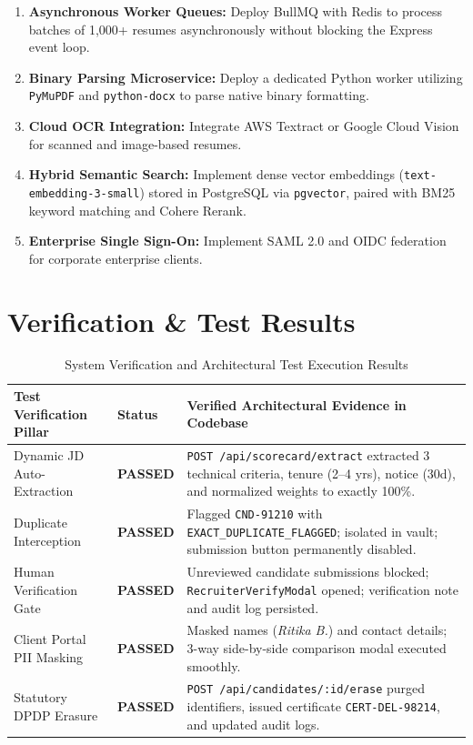 \documentclass[11pt,a4paper,oneside]{report}
\begin{document}
\begin{enumerate}[leftmargin=1.5em]
    \item \textbf{Asynchronous Worker Queues:} Deploy BullMQ with Redis to process batches of 1,000+ resumes asynchronously without blocking the Express event loop.
    \item \textbf{Binary Parsing Microservice:} Deploy a dedicated Python worker utilizing \texttt{PyMuPDF} and \texttt{python-docx} to parse native binary formatting.
    \item \textbf{Cloud OCR Integration:} Integrate AWS Textract or Google Cloud Vision for scanned and image-based resumes.
    \item \textbf{Hybrid Semantic Search:} Implement dense vector embeddings (\texttt{text-embedding-3-small}) stored in PostgreSQL via \texttt{pgvector}, paired with BM25 keyword matching and Cohere Rerank.
    \item \textbf{Enterprise Single Sign-On:} Implement SAML 2.0 and OIDC federation for corporate enterprise clients.
\end{enumerate}

\chapter{Verification \& Test Results}

\begin{table}[H]
\centering
\small
\renewcommand{\arraystretch}{1.2}
\begin{tabularx}{\textwidth}{@{} p{4.2cm} p{2.2cm} X @{}}
    \toprule
    \textbf{Test Verification Pillar} & \textbf{Status} & \textbf{Verified Architectural Evidence in Codebase} \\
    \midrule
    Dynamic JD Auto-Extraction & \textbf{PASSED} & \texttt{POST /api/scorecard/extract} extracted 3 technical criteria, tenure (2--4 yrs), notice (30d), and normalized weights to exactly 100\%. \\
    Duplicate Interception & \textbf{PASSED} & Flagged \texttt{CND-91210} with \texttt{EXACT\_DUPLICATE\_FLAGGED}; isolated in vault; submission button permanently disabled. \\
    Human Verification Gate & \textbf{PASSED} & Unreviewed candidate submissions blocked; \texttt{RecruiterVerifyModal} opened; verification note and audit log persisted. \\
    Client Portal PII Masking & \textbf{PASSED} & Masked names (\textit{Ritika B.}) and contact details; 3-way side-by-side comparison modal executed smoothly. \\
    Statutory DPDP Erasure & \textbf{PASSED} & \texttt{POST /api/candidates/:id/erase} purged identifiers, issued certificate \texttt{CERT-DEL-98214}, and updated audit logs. \\
    \bottomrule
\end{tabularx}
\caption{System Verification and Architectural Test Execution Results}
\end{table}
\end{document}
